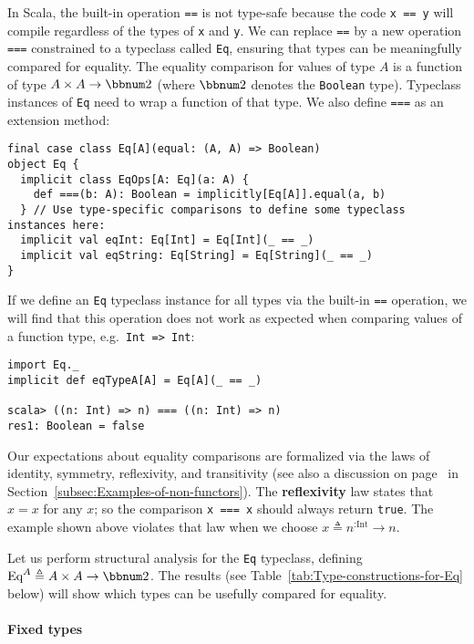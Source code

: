 In Scala, the built-in operation \lstinline!==! is not type-safe
because the code \lstinline!x == y! will compile regardless of the
types of \lstinline!x! and \lstinline!y!. We can replace \lstinline!==!
by a new operation \lstinline!===! constrained to a typeclass called
\lstinline!Eq!, ensuring that types can be meaningfully compared
for equality. The equality comparison for values of type $A$ is a
function of type $A\times A\rightarrow\bbnum 2$ (where $\bbnum 2$
denotes the \lstinline!Boolean! type). Typeclass instances of \lstinline!Eq!
need to wrap a function of that type. We also define \lstinline!===!
as an extension method:
\begin{lstlisting}
final case class Eq[A](equal: (A, A) => Boolean)
object Eq {
  implicit class EqOps[A: Eq](a: A) {
    def ===(b: A): Boolean = implicitly[Eq[A]].equal(a, b)
  } // Use type-specific comparisons to define some typeclass instances here:
  implicit val eqInt: Eq[Int] = Eq[Int](_ == _)
  implicit val eqString: Eq[String] = Eq[String](_ == _)
}
\end{lstlisting}
If we define an \lstinline!Eq! typeclass instance for all types via
the built-in \lstinline!==! operation, we will find that this operation
does not work as expected when comparing values of a function type,
e.g.~\lstinline!Int => Int!: 
\begin{lstlisting}
import Eq._
implicit def eqTypeA[A] = Eq[A](_ == _)

scala> ((n: Int) => n) === ((n: Int) => n)
res1: Boolean = false 
\end{lstlisting}
Our expectations about equality comparisons are formalized via the
laws of identity, symmetry, reflexivity, and transitivity (see also
a discussion on page~\pageref{par:label-equality-laws} in Section~\ref{subsec:Examples-of-non-functors}).
The \textbf{reflexivity} law states that $x=x$
for any $x$; so the comparison \lstinline!x === x! should always
return \lstinline!true!. The example shown above violates that law
when we choose $x\triangleq n^{:\text{Int}}\rightarrow n$.

Let us perform structural analysis for the \lstinline!Eq! typeclass,
defining $\text{Eq}^{A}\triangleq A\times A\rightarrow\bbnum 2$.
The results (see Table~\ref{tab:Type-constructions-for-Eq} below)
will show which types can be usefully compared for equality.

\paragraph{Fixed types}

